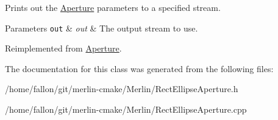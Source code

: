 Prints out the \hyperlink{classAperture}{Aperture} parameters to a specified stream. 
\begin{DoxyParams}[1]{Parameters}
\mbox{\tt out}  & {\em out} & The output stream to use. \\
\hline
\end{DoxyParams}


Reimplemented from \hyperlink{classAperture_aff2f276b93bb2cb94e559e1c4901e38e}{Aperture}.



The documentation for this class was generated from the following files\+:\begin{DoxyCompactItemize}
\item 
/home/fallon/git/merlin-\/cmake/\+Merlin/Rect\+Ellipse\+Aperture.\+h\item 
/home/fallon/git/merlin-\/cmake/\+Merlin/Rect\+Ellipse\+Aperture.\+cpp\end{DoxyCompactItemize}
